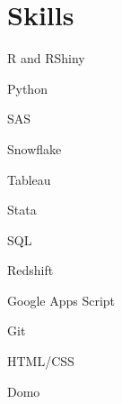 \documentclass[letterpaper,11pt]{article}
\begin{document}
\section{Skills}
\vspace{-1pt}
\begin{itemize}
\small
\begin{minipage}{0.3\linewidth}
    \item R and RShiny
    \item Python
    \item SAS
    \item Snowflake
\end{minipage}
\begin{minipage}{0.025\linewidth}
	\item[\hspace{\fill}]
	\item[\hspace{\fill}]
	\item[\hspace{\fill}]
		\item[\hspace{\fill}]
\end{minipage}
\begin{minipage}{0.3\linewidth}
    \item Tableau
    \item Stata
    \item SQL
    \item Redshift
\end{minipage}
\begin{minipage}{0.025\linewidth}
	\item[\hspace{\fill}]
	\item[\hspace{\fill}]
	\item[\hspace{\fill}]
		\item[\hspace{\fill}]
\end{minipage}
\begin{minipage}{0.3\linewidth}
	\item Google Apps Script
    \item Git
    \item HTML/CSS
    \item Domo
\end{minipage}
\end{itemize}
\end{document}

